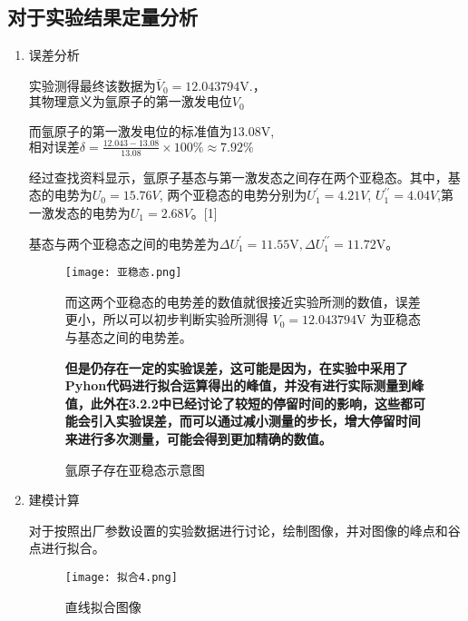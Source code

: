 \documentclass[dvipsnames, svgnames,a4paper,11pt]{article}
\begin{document}
	

	
	
	\subsection{对于实验结果定量分析}

	\begin{enumerate}
		\item 误差分析
	
		\quad \quad 实验测得最终该数据为$\bar{V}_{0}=12.043794\mathrm{V}.$，$\text{其物理意义为氩原子的第一激发电位}V_0$

		\quad \quad 而氩原子的第一激发电位的标准值为13.08V,$\text{相对误差}\delta=\frac{12.043-13.08}{13.08}\times100\%\approx7.92\%$

		\quad \quad 经过查找资料显示，氩原子基态与第一激发态之间存在两个亚稳态。其中，基态的电势为$U_0=15.76V$, 两个亚稳态的电势分别为$U_1^{\prime}=4.21V$, $U_1^{\prime\prime}=4.04V$,第一激发态的电势为$U_{1}=2.68V$。\small [1]
		
		\quad \quad 基态与两个亚稳态之间的电势差为$\Delta U_{1}^{\prime}=11.55\mathrm{V},\Delta U_{1}^{\prime\prime}=11.72\mathrm{V}。$
		\begin{figure}[H]
			\centering
			\begin{minipage}[b]{0.4\linewidth}
				\centering
				\texttt{[image: 亚稳态.png]}
				\caption{氩原子存在亚稳态示意图}
			\end{minipage}
			\quad %
			\begin{minipage}[b]{0.5\linewidth}
				\quad \quad 而这两个亚稳态的电势差的数值就很接近实验所测的数值，误差更小，所以可以初步判断实验所测得 $V_0 = 12.043794\mathrm{V}$ 为亚稳态与基态之间的电势差。
				
				\quad \quad \textbf{但是仍存在一定的实验误差，这可能是因为，在实验中采用了Pyhon代码进行拟合运算得出的峰值，并没有进行实际测量到峰值，此外在3.2.2中已经讨论了较短的停留时间的影响，这些都可能会引入实验误差，而可以通过减小测量的步长，增大停留时间来进行多次测量，可能会得到更加精确的数值。}
			\end{minipage}
		\end{figure}
		
		

		\item 建模计算
		
		对于按照出厂参数设置的实验数据进行讨论，绘制图像，并对图像的峰点和谷点进行拟合。
		\begin{figure}[{H}]
			\centering
			\texttt{[image: 拟合4.png]}
			\caption{直线拟合图像}
			\label{}
		\end{figure}


\end{enumerate}
\end{document}
